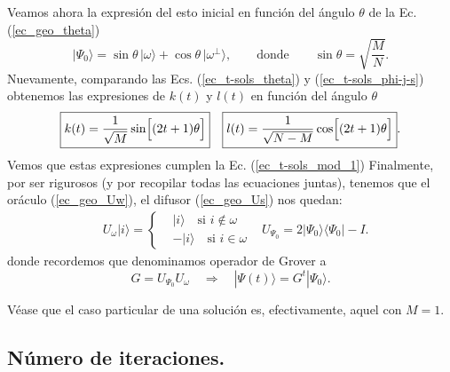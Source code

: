 \documentclass[a4paper,11pt]{article} %
\numberwithin{equation}{section}
\def\lch{\left\{}
\def\Lc{\Bigl[}
\def\Rc{\Bigr]}
\def\rqa{\quad \Rightarrow \quad}
\begin{document}
Veamos ahora la expresión del esto inicial en función del ángulo $\theta$ de la Ec. (\ref{ec_geo_theta})
\begin{equation} \label{ec_t-sols_theta}
| \Psi_0 \rangle = \sin \theta \, |\omega \rangle + \cos \theta \, | \omega^{\perp} \rangle, \qquad \text{donde} \qquad  \boxed{\sin \theta = \sqrt{\frac{M}{N}}}.
\end{equation}
Nuevamente, comparando las Ecs. (\ref{ec_t-sols_theta}) y (\ref{ec_t-sols_phi-j-s}) obtenemos las expresiones de $k(t)$ y $l(t)$ en función del ángulo $\theta$
\begin{align} \label{ec_t-sols_sin-cos}
& \boxed{k(t) = \frac{1}{\sqrt{M}} \sin \Lc (2t+1) \theta \Rc}
& \boxed{l(t) = \frac{1}{\sqrt{N-M}}\cos \Lc (2t+1) \theta \Rc}.
\end{align}
Vemos que estas expresiones cumplen la Ec. (\ref{ec_t-sols_mod_1}) 
Finalmente, por ser rigurosos (y por recopilar todas las ecuaciones juntas), tenemos que el oráculo (\ref{ec_geo_Uw}), el difusor (\ref{ec_geo_Us}) nos quedan:
\begin{align} \label{ec_t-sols_Uw_Us}
& \boxed{U_\omega | i \rangle = 
	\lch
		\begin{matrix}
			& | i \rangle \quad \text{si } i \not \in \omega \\
			& - | i \rangle \quad \text{si } i \in \omega
		\end{matrix}
	\right.}
& \boxed{U_{\Psi_0} = 2 |\Psi_0 \rangle \langle \Psi_0 | - I}.
\end{align}
donde recordemos que denominamos operador de Grover a
\begin{equation} \label{ec_t-sols_G}
\boxed{G = U_{\Psi_0} U_\omega} \rqa |\Psi(t) \rangle =  G^t | \Psi_0 \rangle.
\end{equation}

Véase que el caso particular de una solución es, efectivamente, aquel con $M=1$.

\subsection{Número de iteraciones.}
\end{document}
